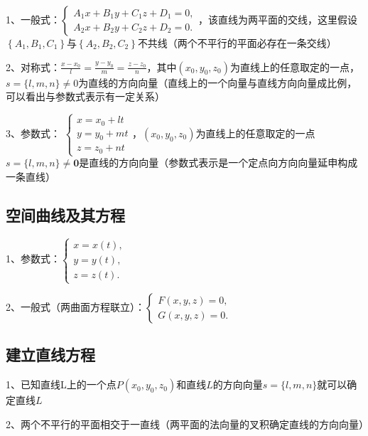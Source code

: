 1、一般式：$ \left\{\begin{array}{l}A_{1} x+B_{1} y+C_{1} z+D_{1}=0, \\ A_{2} x+B_{2} y+C_{2} z+D_{2}=0 .\end{array}\right. $，该直线为两平面的交线，这里假设$ \left\{A_{1}, B_{1},C_{1}\right\} $与$ \left\{A_{2}, B_{2}, C_{2}\right\} $不共线（两个不平行的平面必存在一条交线）

2、对称式：$ \frac{x-x_{0}}{l}=\frac{y-y_{0}}{m}=\frac{z-z_{0}}{n} $，其中$ \left(x_{0}, y_{0}, z_{0}\right) $为直线上的任意取定的一点，$ s=\{l, m, n\} \neq 0 $为直线的方向向量（直线上的一个向量与直线方向向量成比例，可以看出与参数式表示有一定关系）

3、参数式： $ \left\{\begin{array}{l}x=x_{0}+l t \\ y=y_{0}+m t \\ z=z_{0}+n t \end{array}\right. $，$ \left(x_{0}, y_{0}, z_{0}\right) $为直线上的任意取定的一点$ s=\{l, m, n\} \neq \mathbf{0} $是直线的方向向量（参数式表示是一个定点向方向向量延申构成一条直线）



\subsection{空间曲线及其方程}

1、参数式：$ \left\{\begin{array}{l}x=x(t), \\ y=y(t), \\ z=z(t) .\end{array}\right. $

2、一般式（两曲面方程联立）：$ \left\{\begin{array}{l}F(x, y, z)=0, \\ G(x, y, z)=0 .\end{array}\right. $



\subsection{建立直线方程}

1、已知直线L上的一个点$ P\left(x_{0}, y_{0}, z_{0}\right) $和直线$ L $的方向向量$ s=\{l, m, n\} $就可以确定直线$ L $

2、两个不平行的平面相交于一直线（两平面的法向量的叉积确定直线的方向向量）



